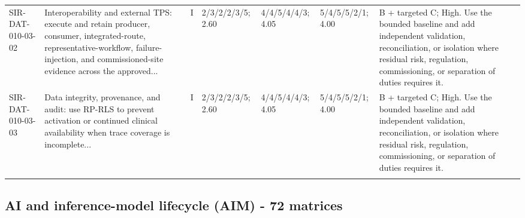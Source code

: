 \documentclass[11pt,letterpaper]{article}
\begin{document}
\begin{scriptsize}
\begin{longtable}{@{}L{0.11\textwidth}L{0.165\textwidth}L{0.04\textwidth}L{0.115\textwidth}L{0.115\textwidth}L{0.115\textwidth}L{0.235\textwidth}@{}}
\addlinespace[2pt]
SIR-DAT-010-03-02 & Interoperability and external TPS: execute and retain producer, consumer, integrated-route, representative-workflow, failure-injection, and commissioned-site evidence across the approved... & I & 2/3/2/2/3/5; 2.60 & 4/4/5/4/4/3; 4.05 & 5/4/5/5/2/1; 4.00 & B + targeted C; High. Use the bounded baseline and add independent validation, reconciliation, or isolation where residual risk, regulation, commissioning, or separation of duties requires it. \\
\addlinespace[2pt]
SIR-DAT-010-03-03 & Data integrity, provenance, and audit: use RP-RLS to prevent activation or continued clinical availability when trace coverage is incomplete... & I & 2/3/2/2/3/5; 2.60 & 4/4/5/4/4/3; 4.05 & 5/4/5/5/2/1; 4.00 & B + targeted C; High. Use the bounded baseline and add independent validation, reconciliation, or isolation where residual risk, regulation, commissioning, or separation of duties requires it. \\
\addlinespace[2pt]
\end{longtable}
\end{scriptsize}

\subsection{AI and inference-model lifecycle (AIM) - 72 matrices}
\end{document}
